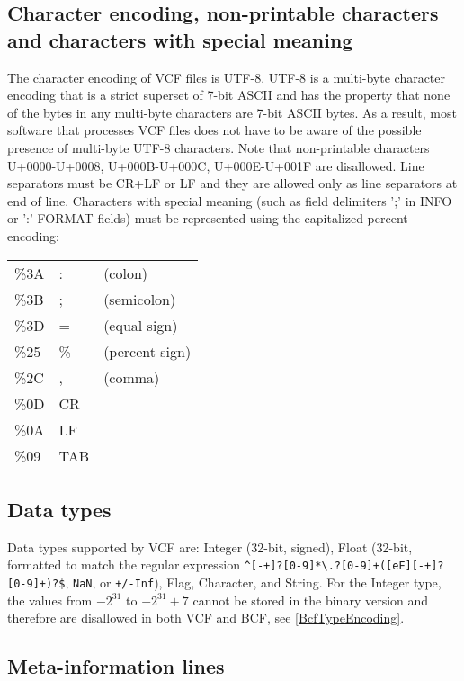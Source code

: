 \documentclass[8pt]{article}
\begin{document}
\subsection{Character encoding, non-printable characters and characters with special meaning}
\label{character-encoding}
The character encoding of VCF files is UTF-8.  UTF-8 is a multi-byte 
character encoding that is a strict superset of 7-bit ASCII and has the 
property that none of the bytes in any multi-byte characters are 7-bit ASCII 
bytes. As a result, most software that processes VCF files does not have 
to be aware of the possible presence of multi-byte UTF-8 characters. 
Note that non-printable characters U+0000-U+0008, U+000B-U+000C, U+000E-U+001F are disallowed.
Line separators must be CR+LF or LF and they are allowed only as line separators at
end of line.
Characters with special meaning (such as field delimiters ';' in INFO 
or ':' FORMAT fields) must be represented using the capitalized percent encoding:

\begingroup\footnotesize
\begin{tabular}{l l l}
\%3A  &  :  & (colon)                \\
\%3B  &  ;  & (semicolon)            \\
\%3D  &  =  & (equal sign)           \\
\%25  &  \% & (percent sign)         \\
\%2C  &  ,  & (comma)                \\
\%0D  & CR  &                        \\
\%0A  & LF  &                        \\
\%09  & TAB & 
\end{tabular}
\endgroup


\subsection{Data types}
Data types supported by VCF are: Integer (32-bit, signed), Float (32-bit, formatted 
to match the regular expression \texttt{\^{}[-+]?[0-9]*\textbackslash.?[0-9]+([eE][-+]?[0-9]+)?\$}, \texttt{NaN}, or \texttt{+/-Inf}), Flag, Character, and
String. For the Integer type, the values from $-2^{31}$ to $-2^{31}+7$ cannot be stored in the binary version and therefore 
are disallowed in both VCF and BCF, see \ref{BcfTypeEncoding}.

\subsection{Meta-information lines}
\end{document}
